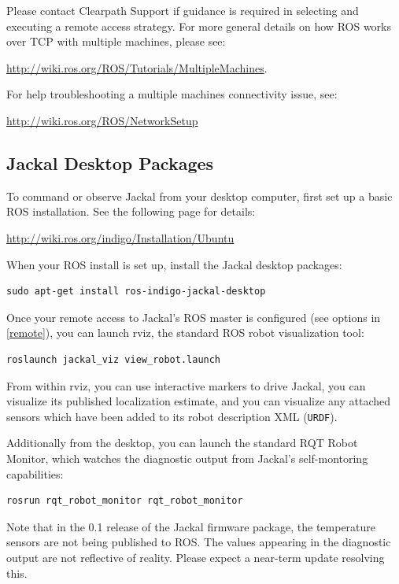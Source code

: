 \documentclass[]{clearpath-latex/clearpath-manual}
\begin{document}
Please contact Clearpath Support if guidance is required in selecting and executing a
remote access strategy. For more general details on how ROS works over TCP with
multiple machines, please see:

\url{http://wiki.ros.org/ROS/Tutorials/MultipleMachines}.

For help troubleshooting a multiple machines connectivity issue, see:

\url{http://wiki.ros.org/ROS/NetworkSetup}

\newpage\subsection{Jackal Desktop Packages}

To command or observe Jackal from your desktop computer, first set up a basic
ROS installation. See the following page for details:

\url{http://wiki.ros.org/indigo/Installation/Ubuntu}

When your ROS install is set up, install the Jackal desktop packages:

\begin{lstlisting}
sudo apt-get install ros-indigo-jackal-desktop
\end{lstlisting}

Once your remote access to Jackal's ROS master is configured (see options in \autoref{remote}),
you can launch rviz, the standard ROS robot visualization tool:

\begin{lstlisting}
roslaunch jackal_viz view_robot.launch
\end{lstlisting}

From within rviz, you can use interactive markers to drive Jackal, you can visualize its
published localization estimate, and you can visualize any attached sensors which have been
added to its robot description XML (\lstinline{URDF}).

Additionally from the desktop, you can launch the standard RQT Robot Monitor, which
watches the diagnostic output from Jackal's self-montoring capabilities:

\begin{lstlisting}
rosrun rqt_robot_monitor rqt_robot_monitor
\end{lstlisting}


\begin{warning}
Note that in the 0.1 release of the Jackal firmware package, the temperature sensors are not
being published to ROS. The values appearing in the diagnostic output are not reflective of
reality. Please expect a near-term update resolving this.
\end{warning}
\end{document}
